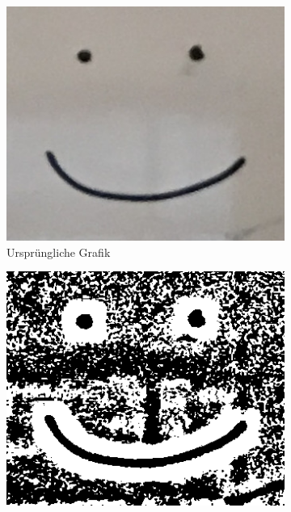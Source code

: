 \begin{figure}[htbp]
    \begin{subfigure}[t]{0.3\textwidth}
        \centering
        \includegraphics[interpolate=true,width=\textwidth]{images/smiley}
        \caption{Ursprüngliche Grafik}%
        \label{fig:essentials_binarize_input}
    \end{subfigure}
    \hfill
    \begin{subfigure}[t]{0.3\textwidth}
        \centering
        \includegraphics[interpolate=true,width=\textwidth]{images/essentials_binarization_sauvola_without_stddev}

\end{subfigure}
\end{figure}
